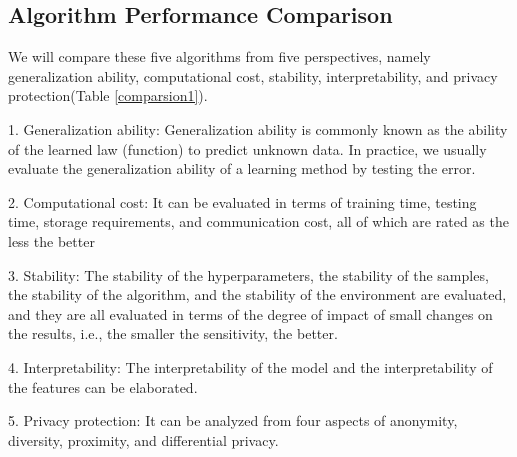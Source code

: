 \documentclass[
  journal=medium,
  manuscript=Report,
  year=2023,
  volume=37,
]{cup-journal}
\begin{document}
\subsection{Algorithm Performance Comparison}

We will compare these five algorithms from five perspectives, namely generalization ability, computational cost, stability, interpretability, and privacy protection(Table \ref{comparsion1}).

1. Generalization ability: Generalization ability is commonly known as the ability of the learned law (function) to predict unknown data. In practice, we usually evaluate the generalization ability of a learning method by testing the error.

2. Computational cost: It can be evaluated in terms of training time, testing time, storage requirements, and communication cost, all of which are rated as the less the better

3. Stability: The stability of the hyperparameters, the stability of the samples, the stability of the algorithm, and the stability of the environment are evaluated, and they are all evaluated in terms of the degree of impact of small changes on the results, i.e., the smaller the sensitivity, the better.

4. Interpretability: The interpretability of the model and the interpretability of the features can be elaborated.

5. Privacy protection: It can be analyzed from four aspects of anonymity, diversity, proximity, and differential privacy.
\end{document}
